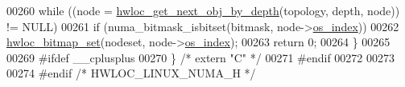 \begin{DoxyCode}
00260   \textcolor{keywordflow}{while} ((node = \hyperlink{a00187_gac140a9b939d9fa0b30c4a910efcb0656}{hwloc\_get\_next\_obj\_by\_depth}(topology, depth, node)) != NULL)
00261     \textcolor{keywordflow}{if} (numa\_bitmask\_isbitset(bitmask, node->\hyperlink{a00238_a61a7a80a68eaccbaaa28269e678c81a9}{os\_index}))
00262       \hyperlink{a00205_ga062dbff93baeff3b425a7260c5463646}{hwloc\_bitmap\_set}(nodeset, node->\hyperlink{a00238_a61a7a80a68eaccbaaa28269e678c81a9}{os\_index});
00263   \textcolor{keywordflow}{return} 0;
00264 \}
00265 
00269 \textcolor{preprocessor}{#ifdef \_\_cplusplus}
00270 \} \textcolor{comment}{/* extern "C" */}
00271 \textcolor{preprocessor}{#endif}
00272 
00273 
00274 \textcolor{preprocessor}{#endif }\textcolor{comment}{/* HWLOC\_LINUX\_NUMA\_H */}\textcolor{preprocessor}{}
\end{DoxyCode}
